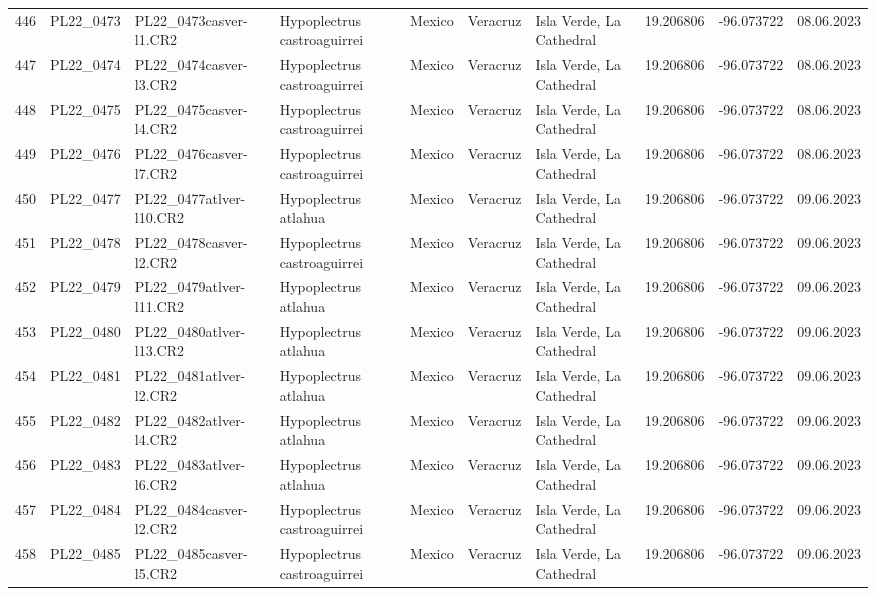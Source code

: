 \begin{table}[ht]
\begin{tabular}{rlllllllll}
  446 & PL22\_0473 & PL22\_0473casver-l1.CR2 & Hypoplectrus castroaguirrei & Mexico & Veracruz & Isla Verde, La Cathedral & 19.206806 & -96.073722 & 08.06.2023 \\ 
  447 & PL22\_0474 & PL22\_0474casver-l3.CR2 & Hypoplectrus castroaguirrei & Mexico & Veracruz & Isla Verde, La Cathedral & 19.206806 & -96.073722 & 08.06.2023 \\ 
  448 & PL22\_0475 & PL22\_0475casver-l4.CR2 & Hypoplectrus castroaguirrei & Mexico & Veracruz & Isla Verde, La Cathedral & 19.206806 & -96.073722 & 08.06.2023 \\ 
  449 & PL22\_0476 & PL22\_0476casver-l7.CR2 & Hypoplectrus castroaguirrei & Mexico & Veracruz & Isla Verde, La Cathedral & 19.206806 & -96.073722 & 08.06.2023 \\ 
  450 & PL22\_0477 & PL22\_0477atlver-l10.CR2 & Hypoplectrus atlahua & Mexico & Veracruz & Isla Verde, La Cathedral & 19.206806 & -96.073722 & 09.06.2023 \\ 
  451 & PL22\_0478 & PL22\_0478casver-l2.CR2 & Hypoplectrus castroaguirrei & Mexico & Veracruz & Isla Verde, La Cathedral & 19.206806 & -96.073722 & 09.06.2023 \\ 
  452 & PL22\_0479 & PL22\_0479atlver-l11.CR2 & Hypoplectrus atlahua & Mexico & Veracruz & Isla Verde, La Cathedral & 19.206806 & -96.073722 & 09.06.2023 \\ 
  453 & PL22\_0480 & PL22\_0480atlver-l13.CR2 & Hypoplectrus atlahua & Mexico & Veracruz & Isla Verde, La Cathedral & 19.206806 & -96.073722 & 09.06.2023 \\ 
  454 & PL22\_0481 & PL22\_0481atlver-l2.CR2 & Hypoplectrus atlahua & Mexico & Veracruz & Isla Verde, La Cathedral & 19.206806 & -96.073722 & 09.06.2023 \\ 
  455 & PL22\_0482 & PL22\_0482atlver-l4.CR2 & Hypoplectrus atlahua & Mexico & Veracruz & Isla Verde, La Cathedral & 19.206806 & -96.073722 & 09.06.2023 \\ 
  456 & PL22\_0483 & PL22\_0483atlver-l6.CR2 & Hypoplectrus atlahua & Mexico & Veracruz & Isla Verde, La Cathedral & 19.206806 & -96.073722 & 09.06.2023 \\ 
  457 & PL22\_0484 & PL22\_0484casver-l2.CR2 & Hypoplectrus castroaguirrei & Mexico & Veracruz & Isla Verde, La Cathedral & 19.206806 & -96.073722 & 09.06.2023 \\ 
  458 & PL22\_0485 & PL22\_0485casver-l5.CR2 & Hypoplectrus castroaguirrei & Mexico & Veracruz & Isla Verde, La Cathedral & 19.206806 & -96.073722 & 09.06.2023 \\ 

\end{tabular}
\end{table}
